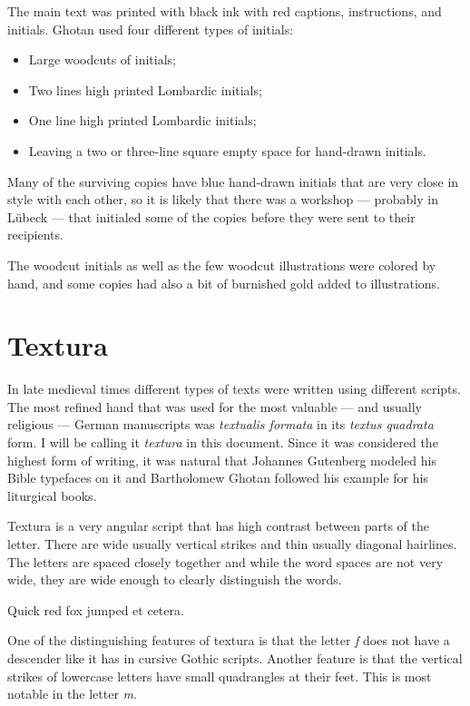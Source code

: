 \documentclass[a4paper, 12pt]{article}
\newcommand{\sample}[1]{{\mstexturafamily\fontsize{18}{18}\selectfont #1}}
\begin{document}
The main text was printed with black ink with red captions,
instructions, and initials. Ghotan used four different types of
initials:
\begin{itemize}
\item Large woodcuts of initials;

\item Two lines high printed Lombardic initials;

\item One line high printed Lombardic initials;

\item Leaving a two or three-line square empty space for hand-drawn
  initials.

\end{itemize}

Many of the surviving copies have blue hand-drawn initials that are
very close in style with each other, so it is likely that there was a
workshop — probably in Lübeck — that initialed some of the copies
before they were sent to their recipients. 

The woodcut initials as well as the few woodcut illustrations were
colored by hand, and some copies had also a bit of burnished gold
added to illustrations.


\section{Textura}

In late medieval times different types of texts were written using
different scripts. The most refined hand that was used for the most
valuable — and usually religious — German manuscripts was
\emph{textualis formata} in its \emph{textus quadrata} form. I will be
calling it \emph{textura} in this document. Since it was considered
the highest form of writing, it was natural that Johannes Gutenberg
modeled his Bible typefaces on it and Bartholomew Ghotan followed his
example for his liturgical books. 

Textura is a very angular script that has high contrast between parts of
the letter. There are wide usually vertical strikes and thin usually
diagonal hairlines. The letters are spaced closely together and while
the word spaces are not very wide, they are wide enough to clearly
distinguish the words.
\begin{center}
  \sample{Quick red fox jumped et cetera.}
\end{center}

One of the distinguishing features of textura is that the letter
\emph{f} does not have a descender like it has in cursive Gothic
scripts. Another feature is that the vertical strikes of lowercase
letters have small quadrangles at their feet. This is most notable in
the letter \emph{m}.
\end{document}

